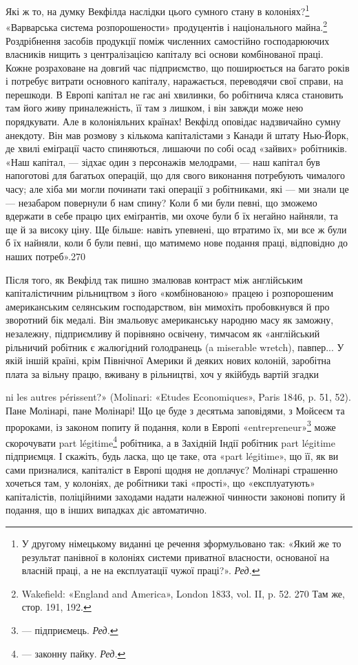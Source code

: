 Які ж то, на думку Векфілда наслідки цього сумного стану в колоніях?\footnote*{
У другому німецькому виданні це речення зформульовано так: «Який же то результат панівної в
колоніях системи приватної власности, основаної на власній праці, а не на експлуатації чужої
праці?». \emph{Ред.}
} «Варварська система
розпорошености» продуцентів і національного майна.\footnote{
Wakefield: «England and America», London 1833, vol. II, p. 52.
270 Там же, стор. 191, 192.
} Роздрібнення засобів
продукції поміж численних самостійно господарюючих власників нищить з централізацією капіталу всі
основи комбінованої праці. Кожне розраховане на довгий час підприємство, що поширюється на багато
років і потребує витрати основного капіталу, наражається, переводячи свої справи, на перешкоди. В
Европі капітал не гає ані хвилинки, бо робітнича кляса становить там його живу приналежність, її там
з лишком, і він завжди може нею порядкувати. Але в колоніяльних країнах! Векфілд
оповідає надзвичайно сумну анекдоту. Він мав розмову з кількома капіталістами з Канади й штату
Нью-Йорк, де хвилі еміґрації часто спиняються, лишаючи по собі осад «зайвих» робітників. «Наш
капітал, — зідхає один з персонажів мелодрами, — наш капітал був напоготові для багатьох операцій,
що для свого виконання потребують чималого часу; але хіба ми могли починати такі операції з
робітниками, які — ми знали це — незабаром повернули б нам спину? Коли б ми були певні, що зможемо
вдержати в себе працю цих еміґрантів, ми охоче були б їх негайно найняли, та ще й за високу ціну. Ще
більше: навіть упевнені, що втратимо їх, ми все ж були б їх найняли, коли б були певні, що матимемо
нове подання праці, відповідно до наших потреб».270

Після того, як Векфілд так пишно змалював контраст між англійським капіталістичним рільництвом з
його «комбінованою» працею і розпорошеним американським селянським господарством, він мимохіть
пробовкнувся й про зворотний бік
медалі. Він змальовує американську народню масу як заможну, незалежну, підприємливу й порівняно
освічену, тимчасом як «англійський рільничий робітник є жалюгідний голодранець (a miserable wretch),
павпер... У якій іншій країні, крім Північної Америки й деяких нових колоній, заробітна плата за
вільну працю, вживану в рільництві, хоч у якійбудь вартій згадки

ni les autres périssent?» (Molinari: «Etudes Economiques», Paris 1846, p. 51, 52). Пане Молінарі,
пане Молінарі! Що це буде з десятьма заповідями, з Мойсеєм та пророками, із законом попиту й
подання, коли в Европі «entrepreneur»\footnote*{
— підприємець. \emph{Ред.}
} може скорочувати part légitime\footnote*{
— законну пайку. \emph{Ред.}
} робітника, а в Західній
Індії робітник part légitime підприємця. І скажіть, будь ласка, що це таке, ота «part légitime», що
її, як ви сами призналися, капіталіст
в Европі щодня не доплачує? Молінарі страшенно хочеться там, у колоніях, де робітники такі «прості»,
що «експлуатують» капіталістів, поліційними заходами надати належної чинности законові попиту й
подання, що в інших випадках діє автоматично.
\parbreak{}  %
